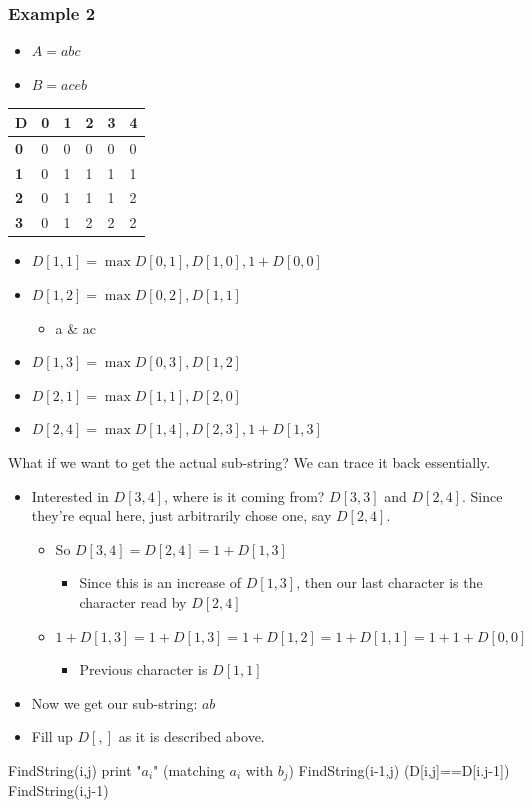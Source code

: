\documentclass[11pt]{article}
\begin{document}
\subsubsection{Example 2}
\label{sec:org411f9b4}
\begin{itemize}
\item \(A=abc\)
\item \(B=aceb\)
\end{itemize}
\begin{tabular}{l | l | l | l | l | l}
  \textbf{D} & \textbf{0} &\textbf{1} &\textbf{2} &\textbf{3}& \textbf{4}
  \\ \hline \textbf{0} & 0 & 0 & 0 & 0 & 0
  \\ \hline \textbf{1} & 0 & 1 & 1 & 1 & 1 
  \\ \hline \textbf{2} & 0 & 1 & 1 & 1 & 2
  \\ \hline \textbf{3} & 0 & 1 & 2 & 2 & 2
\end{tabular}
\begin{itemize}
\item \(D[1,1] = \max{D[0,1],D[1,0],1+D[0,0]}\)
\item \(D[1,2] = \max{D[0,2],D[1,1]}\)
\begin{itemize}
\item a \& ac
\end{itemize}
\item \(D[1,3] = \max{D[0,3],D[1,2]}\)
\item \(D[2,1] = \max{D[1,1],D[2,0]}\)
\item \(D[2,4] = \max{D[1,4],D[2,3],1+D[1,3]}\)
\end{itemize}
What if we want to get the actual sub-string? We can trace it back essentially. 
\begin{itemize}
\item Interested in \(D[3,4]\), where is it coming from? \(D[3,3]\) and \(D[2,4]\). Since they're equal here, just arbitrarily chose one, say \(D[2,4]\).
\begin{itemize}
\item So \(D[3,4]=D[2,4] = 1+D[1,3]\)
\begin{itemize}
\item Since this is an increase of \(D[1,3]\), then our last character is the character read by \(D[2,4]\)
\end{itemize}
\item \(1+D[1,3] = 1+D[1,3] = 1+D[1,2] =1+D[1,1]=1+1+D[0,0]\)
\begin{itemize}
\item Previous character is \(D[1,1]\)
\end{itemize}
\end{itemize}
\item Now we get our sub-string: \(ab\)
\item Fill up \(D[,]\) as it is described above.
\end{itemize}
\begin{algorithmic}
\State FindString(i,j)
    \State print "$a_i$" (matching $a_i$ with $b_j$)
\Else
	    \State FindString(i-1,j)
	\Else (D[i,j]==D[i.j-1])
	      \State FindString(i,j-1)
	\EndIf
\EndIf
\end{algorithmic}
\end{document}
